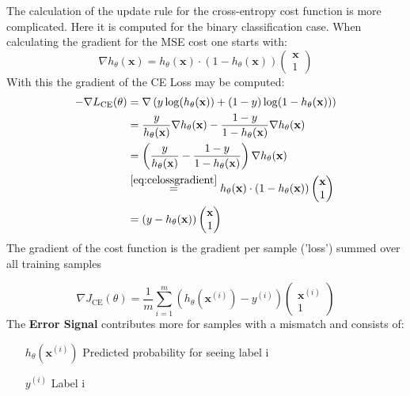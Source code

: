 \documentclass[11pt]{article}
\begin{document}
The calculation of the update rule for the cross-entropy cost function is more complicated. Here it is computed for the binary classification case. When calculating the gradient for the MSE cost one starts with:
\begin{equation}\label{eq:celossgradient}
	\nabla h_\theta(\textbf{x}) = h_\theta(\textbf{x})\cdot(1-h_\theta(\textbf{x}))\begin{pmatrix}
	\textbf{x}\\
	1
	\end{pmatrix}
\end{equation}
\noindent
With this the gradient of the CE Loss may be computed:
\begin{align*}
	-\nabla L_{\text{CE}}(\theta) &= \nabla\left(y\log(h_\theta(\textbf{x})) + (1-y)\log(1-h_\theta(\textbf{x})) \right)  \\
	&= \frac{y}{h_\theta(\textbf{x})} \nabla h_\theta(\textbf{x}) - \frac{1-y}{1-h_\theta(\textbf{x})}\nabla h_\theta(\textbf{x})\\
	&= \left(\frac{y}{h_\theta(\textbf{x})} - \frac{1-y}{1-h_\theta(\textbf{x})}\right)\nabla h_\theta(\textbf{x})\\
	&\overset{\ref{eq:celossgradient}}{=} h_\theta(\textbf{x})\cdot(1-h_\theta(\textbf{x}))\begin{pmatrix}
	\textbf{x}\\
	1
	\end{pmatrix}\\
	&= (y-h_\theta(\textbf{x}))\begin{pmatrix}
	\textbf{x}\\
	1
	\end{pmatrix}
\end{align*}
\noindent
The gradient of the cost function is the gradient per sample ('loss') summed over all training samples

\begin{equation}
	\nabla J_{\text{CE}} (\theta) = \frac{1}{m}\sum_{i=1}^{m}\left( h_\theta(\textbf{x}^{(i)}) - y^{(i)} \right)\begin{pmatrix}
	\textbf{x}^{(i)}\\
	1
	\end{pmatrix}
\end{equation}
\noindent
The \textbf{Error Signal} contributes more for samples with a mismatch and consists of:
\begin{itemize}[leftmargin=*, labelindent=2cm, labelsep=1cm]
	\item[$h_\theta(\textbf{x}^{(i)})$] Predicted probability for seeing label i
	\item[$y^{(i)}$] Label i
\end{itemize}
\end{document}
